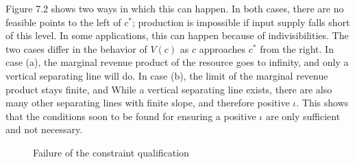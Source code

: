 Figure 7.2 shows two ways in which this can happen. In both cases, there are no feasible points to the left of $c^*$; production is impossible if input supply falls short of this level. In some applications, this can happen because of indivisibilities. The two cases
differ in the behavior of $V(c)$ as $c$ approaches $c^*$ from the right. In case (a), the marginal revenue product of the resource goes to infinity, and only a vertical separating line will do. In case (b), the limit of the marginal revenue product stays finite, and While a vertical separating line exists, there are also many other separating lines with finite slope, and therefore positive $\iota$. This shows that the conditions soon to be found for ensuring a positive $\iota$ are only sufficient and not necessary.

\begin{figure}[!htp]  %
 \centering
 \caption{Failure of the constraint qualification} 
\label{Fig7.2} 
\end{figure}

